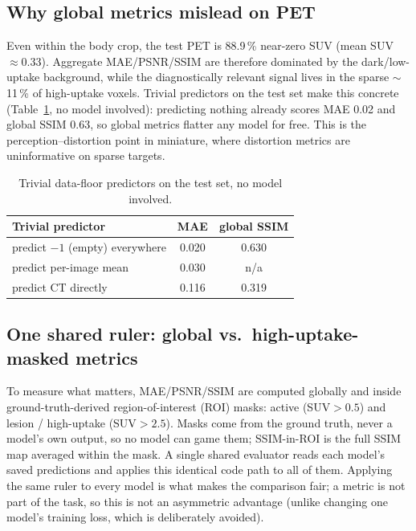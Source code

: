 \documentclass[11pt,a4paper]{article}
\newcommand{\num}[1]{#1}
\begin{document}
\subsection{Why global metrics mislead on PET}
Even within the body crop, the test PET is \num{88.9}\,\% near-zero SUV
(mean SUV $\approx \num{0.33}$). Aggregate MAE/PSNR/SSIM are therefore dominated by the
dark/low-uptake background, while the diagnostically relevant signal lives in the sparse
$\sim$\num{11}\,\% of high-uptake voxels. Trivial predictors on the test set make this concrete
(Table~\ref{tab:trivial}, no model involved): predicting nothing already scores MAE \num{0.02} and
global SSIM \num{0.63}, so global metrics flatter any model for free. This is the
perception--distortion point in miniature, where distortion metrics are uninformative on sparse
targets.

\begin{table}[h]\centering\small
\caption{Trivial data-floor predictors on the test set, no model involved.}
\label{tab:trivial}
\begin{tabular}{lcc}
\toprule
Trivial predictor & MAE & global SSIM \\
\midrule
predict $-1$ (empty) everywhere & \num{0.020} & \num{0.630} \\
predict per-image mean          & \num{0.030} & n/a \\
predict CT directly             & \num{0.116} & \num{0.319} \\
\bottomrule
\end{tabular}
\end{table}

\subsection{One shared ruler: global vs.\ high-uptake-masked metrics}
To measure what matters, MAE/PSNR/SSIM are computed globally and inside
ground-truth-derived region-of-interest (ROI) masks: active (SUV$>0.5$) and
lesion / high-uptake (SUV$>2.5$). Masks come from the ground truth, never a
model's own output, so no model can game them; SSIM-in-ROI is the full SSIM map averaged
within the mask. A single shared evaluator reads each model's saved predictions and applies
this identical code path to all of them. Applying the same ruler to every model is what
makes the comparison fair; a metric is not part of the task, so this is not an asymmetric
advantage (unlike changing one model's training loss, which is deliberately avoided).
\end{document}
